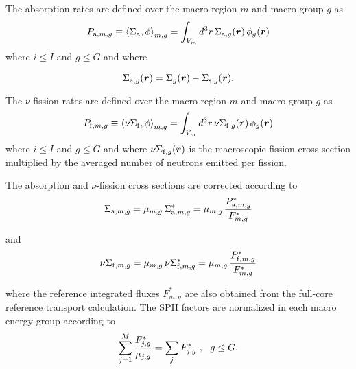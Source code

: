 The absorption rates are defined over the macro-region $m$ and macro-group $g$ as
\begin{equation}
P_{{\rm a},m,g}\equiv \left< \Sigma_{\rm a} , \phi \right>_{m,g}=\int_{V_m} d^3r \, \Sigma_{{\rm a},g}(\bff(r)) \, \phi_g(\bff(r))
\label{eq:eq2.2}
\end{equation}
\noindent where $i\le I$ and $g\le G$ and where

\begin{equation}
\Sigma_{{\rm a},g}(\bff(r))=\Sigma_g(\bff(r))-\Sigma_{{\rm s},g}(\bff(r)) .
\label{eq:eq2.3}
\end{equation}

\vskip 0.08cm

The $\nu$-fission rates are defined over the macro-region $m$ and macro-group $g$ as
\begin{equation}
P_{{\rm f},m,g}\equiv \left< \nu\Sigma_{\rm f} , \phi \right>_{m,g}=\int_{V_m} d^3r \, \nu\Sigma_{{\rm f},g}(\bff(r)) \, \phi_g(\bff(r))
\label{eq:eq2.2b}
\end{equation}
\noindent where $i\le I$ and $g\le G$ and where $\nu\Sigma_{{\rm f},g}(\bff(r))$ is the macroscopic fission cross section multiplied by the averaged number of neutrons emitted per fission.

\vskip 0.08cm

The absorption and $\nu$-fission  cross sections are corrected according to
\begin{equation}
\Sigma_{{\rm a},m,g}=\mu_{m,g}\, \Sigma^*_{{\rm a},m,g} =\mu_{m,g}\, {P^*_{{\rm a},m,g} \over F^*_{m,g}}
\label{eq:eq2.4}
\end{equation}

\noindent and
\begin{equation}
\nu\Sigma_{{\rm f},m,g}=\mu_{m,g}\, \nu\Sigma^*_{{\rm f},m,g} =\mu_{m,g}\, {P^*_{{\rm f},m,g} \over F^*_{m,g}}
\label{eq:eq2.4b}
\end{equation}

\noindent where the reference integrated fluxes $F^*_{m,g}$ are also obtained from the full-core reference transport calculation. The SPH factors are normalized in each macro energy group
according to
\begin{equation}
\sum_{j=1}^M{F^*_{j,g} \over \mu_{j,g}} = \sum_j F^*_{j,g}  \ , \ \ g \le G .
\label{eq:eq2.5}
\end{equation}

\vskip 0.08cm

